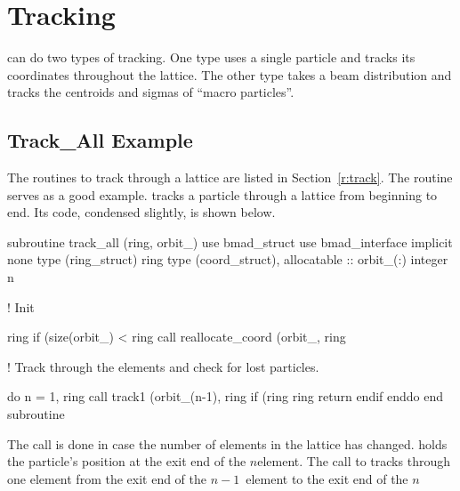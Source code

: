 \chapter{Tracking}
\label{s:tm}

\bmad can do two types of tracking. One type uses a single particle 
and tracks its coordinates throughout the lattice. The other type
takes a beam distribution and tracks the centroids and sigmas of
``macro particles''.  

\section{Track\_All Example}

The routines to track through a lattice are listed in
Section~\ref{r:track}. The  routine serves as a good
example.  tracks a particle through a lattice from
beginning to end. Its code, condensed slightly, is shown below.
\begin{example}
  subroutine track_all (ring, orbit_)
    use bmad_struct
    use bmad_interface
    implicit none
    type (ring_struct)  ring
    type (coord_struct), allocatable :: orbit_(:)
    integer n

  ! Init

    ring%
    if (size(orbit_) < ring%
                    call reallocate_coord (orbit_, ring%

  ! Track through the elements and check for lost particles.

    do n = 1, ring%
      call track1 (orbit_(n-1), ring%
      if (ring%
        ring%
        return
      endif
    enddo
  end subroutine
\end{example}
The  call is done in case the number of elements
in the lattice has changed.  holds the particle's
position at the exit end of the $n$\Th element. The call to
 tracks through one element from the exit end of the
$n-1$\St\ element to the exit end of the $n$\Th
